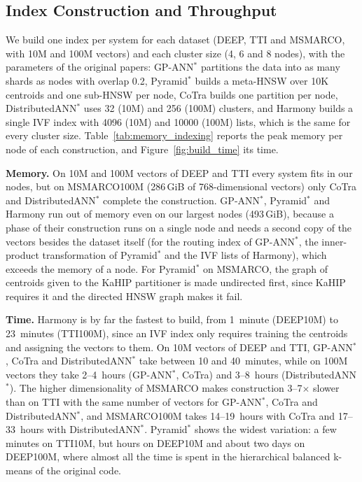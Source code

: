 \subsection{Index Construction and Throughput}
\label{sec:indexConstruction}
We build one index per system for each dataset (DEEP, TTI and MSMARCO, with 10M
and 100M vectors) and each cluster size (4, 6 and 8 nodes), with the
parameters of the original papers: GP-ANN$^{*}$ partitions the data into as
many shards as nodes with overlap 0.2, Pyramid$^{*}$ builds a meta-HNSW over
10K centroids and one sub-HNSW per node, CoTra builds one partition per node,
DistributedANN$^{*}$ uses 32 (10M) and 256 (100M) clusters, and Harmony builds a
single IVF index with 4096 (10M) and 10000 (100M) lists, which is the same for
every cluster size. Table~\ref{tab:memory_indexing} reports the peak memory per
node of each construction, and Figure~\ref{fig:build_time} its time.

\textbf{Memory.} On 10M and 100M vectors of DEEP and TTI every system fits in
our nodes, but on MSMARCO100M (286\,GiB of 768-dimensional vectors) only CoTra
and DistributedANN$^{*}$ complete the construction. GP-ANN$^{*}$, Pyramid$^{*}$
and Harmony run out of memory even on our largest nodes (493\,GiB), because a
phase of their construction runs on a single node and needs a second copy of the
vectors besides the dataset itself (for the routing index of GP-ANN$^{*}$, the
inner-product transformation of Pyramid$^{*}$ and the IVF lists of Harmony),
which exceeds the memory of a node. For Pyramid$^{*}$ on MSMARCO, the graph of centroids given to the KaHIP
partitioner is made undirected first, since KaHIP requires it and the directed
HNSW graph makes it fail.

\textbf{Time.} Harmony is by far the fastest to build, from 1~minute (DEEP10M) to
23~minutes (TTI100M), since an IVF index only requires training the centroids and
assigning the vectors to them. On 10M vectors of DEEP and TTI, GP-ANN$^{*}$, CoTra
and DistributedANN$^{*}$ take between 10 and 40~minutes, while on 100M vectors
they take 2--4~hours (GP-ANN$^{*}$, CoTra) and 3--8~hours
(DistributedANN$^{*}$). The higher dimensionality of MSMARCO makes construction
3--7$\times$ slower than on TTI with the same number of vectors for GP-ANN$^{*}$,
CoTra and DistributedANN$^{*}$, and
MSMARCO100M takes 14--19~hours with CoTra and 17--33~hours with
DistributedANN$^{*}$. Pyramid$^{*}$ shows the widest variation: a few minutes on
TTI10M, but hours on DEEP10M and about two days on DEEP100M, where almost all
the time is spent in the hierarchical balanced k-means of the original code.

